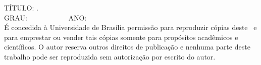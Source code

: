 \begin{titlepage}
{	TÍTULO: \ttitle.\\
	GRAU: \tdegree~~~~~~~~~~~ANO: \tyear\\
	\vspace{5mm}
	É concedida à Universidade de Brasília permissão para reproduzir cópias deste \tdoctype ~e para emprestar ou vender tais cópias somente para propósitos acadêmicos e científicos. O autor reserva outros direitos de publicação e nenhuma parte deste trabalho pode ser reproduzida sem autorização por escrito do autor.
	\vspace{7mm}
}
\end{titlepage}